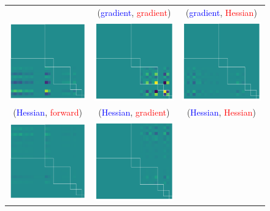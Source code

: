 \begin{figure}[t]
\begin{tabular}{ccc}
    &
      (\textcolor{blue}{gradient}, \textcolor{red}{gradient})
    &
      (\textcolor{blue}{gradient}, \textcolor{red}{Hessian})
    \\
    \includegraphics[width=0.22\linewidth]{kfac_pinns_exp/exp04_gramian_contributions/fig/gram_grad_input_output.png}
    &
      \includegraphics[width=0.22\linewidth]{kfac_pinns_exp/exp04_gramian_contributions/fig/gram_grad_input_grad_input.png}
    &
      \includegraphics[width=0.22\linewidth]{kfac_pinns_exp/exp04_gramian_contributions/fig/gram_grad_input_hess_input.png}
    \\
    (\textcolor{blue}{Hessian}, \textcolor{red}{forward})
    &
      (\textcolor{blue}{Hessian}, \textcolor{red}{gradient})
    &
      (\textcolor{blue}{Hessian}, \textcolor{red}{Hessian})
    \\
    \includegraphics[width=0.22\linewidth]{kfac_pinns_exp/exp04_gramian_contributions/fig/gram_hess_input_output.png}
    &
      \includegraphics[width=0.22\linewidth]{kfac_pinns_exp/exp04_gramian_contributions/fig/gram_hess_input_grad_input.png}

\end{tabular}
\end{figure}
